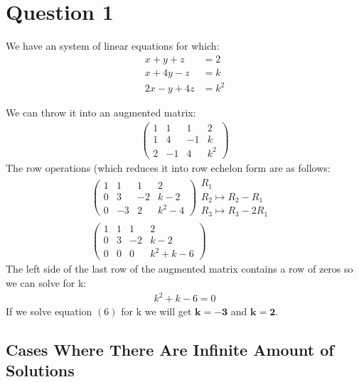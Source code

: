 \documentclass[11pt]{article}
\begin{document}
\pagebreak
\tableofcontents
\pagebreak

\section{Question 1}
We have an system of linear equations for which:
\begin{align}
x+y+z &= 2 \\
x + 4y - z &= k \\
2x-y + 4z &= k^2 
\end{align} 

We can throw it into an augmented matrix:
\begin{align*}
\left(\begin{array}{ccc|c}
1 & 1 & 1 & 2 \\
1 & 4 & -1 & k \\
2 & -1 & 4 & k^2
\end{array}\right)
\end{align*}
The row operations (which reduces it into row echelon form are as follows:
\begin{align}
\left(\begin{array}{ccc|c}
1 & 1 & 1 & 2 \\
0 & 3 & -2 & k-2 \\
0 & -3 & 2 & k^2-4
\end{array}\right)
\begin{array}{l}
  \text{$R_1$}\\
  \text{$R_2 \longmapsto R_2-R_1$}\\
  \text{$R_3 \longmapsto R_3-2R_1$ }
\end{array}
\\
\left(\begin{array}{ccc|c}
1 & 1 & 1 & 2 \\
0 & 3 & -2 & k-2 \\
0 & 0 & 0 & k^2+k-6
\end{array}\right)
\end{align}
The left side of the last row of the augmented matrix contains a row of zeros so we can solve for k:
\begin{align}
 k^2+k-6=0
\end{align}
If we solve equation $(6)$ for k we will get $\bm{k = -3}$ and $\bm{k=2}$.  \\
\newpage
\subsection{Cases Where There Are Infinite Amount of Solutions}
\end{document}
